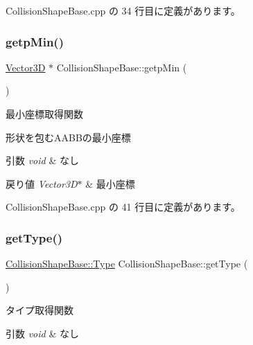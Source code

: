  Collision\+Shape\+Base.\+cpp の 34 行目に定義があります。

\mbox{\label{class_collision_shape_base_a426957f57223656c8ef26cec368288d0}} 
\subsubsection{\texorpdfstring{getp\+Min()}{getpMin()}}
{\footnotesize\ttfamily \mbox{\hyperlink{class_vector3_d}{Vector3D}} $\ast$ Collision\+Shape\+Base\+::getp\+Min (\begin{DoxyParamCaption}{ }\end{DoxyParamCaption})}



最小座標取得関数 

形状を包む\+A\+A\+B\+Bの最小座標 
\begin{DoxyParams}{引数}
{\em void} & なし \\
\hline
\end{DoxyParams}

\begin{DoxyRetVals}{戻り値}
{\em Vector3\+D$\ast$} & 最小座標 \\
\hline
\end{DoxyRetVals}


 Collision\+Shape\+Base.\+cpp の 41 行目に定義があります。

\mbox{\label{class_collision_shape_base_a3dac385b3718f80171046cde33da04b1}} 
\subsubsection{\texorpdfstring{get\+Type()}{getType()}}
{\footnotesize\ttfamily \mbox{\hyperlink{class_collision_shape_base_a8abcef092855ad0ca191047044b002cb}{Collision\+Shape\+Base\+::\+Type}} Collision\+Shape\+Base\+::get\+Type (\begin{DoxyParamCaption}{ }\end{DoxyParamCaption})}



タイプ取得関数 


\begin{DoxyParams}{引数}
{\em void} & なし \\
\hline
\end{DoxyParams}

